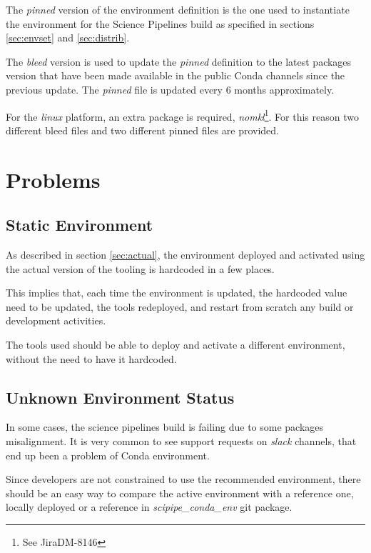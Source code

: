 The \textit{pinned} version of the environment definition is the one used to instantiate the environment for the Science Pipelines build as specified in sections \ref{sec:envset} and \ref{sec:distrib}.

The \textit{bleed} version is used to update the \textit{pinned} definition to the latest packages version that have been made available in the public Conda channels since the previous update.
The \textit{pinned} file is updated every 6 months approximately.

For the \textit{linux} platform, an extra package is required, \textit{nomkl}\footnote{See Jira{DM-8146}}. For this reason two different bleed files and two different pinned files are provided.


\newpage
\section{Problems} \label{sec:problems}


\subsection{Static Environment} \label{sec:static}

As described in section \ref{sec:actual}, the environment deployed and activated using the actual version of the tooling is hardcoded in a few places.

This implies that, each time the environment is updated, the hardcoded value need to be updated, the tools redeployed, and restart from scratch any build or development activities.

The tools used should be able to deploy and activate a different environment, without the need to have it hardcoded.


\subsection{Unknown Environment Status} \label{sec:unknown}

In some cases, the science pipelines build is failing due to some packages misalignment. 
It is very common to see support requests on \textit{slack} channels, that end up been a problem of Conda environment.

Since developers are not constrained to use the recommended environment, there should be an easy way to compare the active environment  with a reference one, locally deployed or a reference in \textit{scipipe\_conda\_env} git package.


